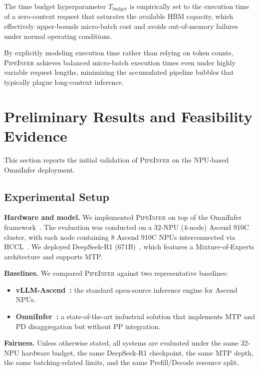 \documentclass[12pt,a4paper]{article}
\newcommand{\sys}{\textsc{PipeInfer}\xspace}
\newcommand{\Prefillterm}{Prefill\xspace}
\newcommand{\Decodeterm}{Decode\xspace}
\newcommand{\clusterconfig}{32-NPU (4-node) Ascend 910C cluster\xspace}
\begin{document}
The time budget hyperparameter $T_{\mathrm{budget}}$ is empirically set to the execution time of a zero-context request that saturates the available HBM capacity, which effectively upper-bounds micro-batch cost and avoids out-of-memory failures under normal operating conditions.

By explicitly modeling execution time rather than relying on token counts, \sys achieves balanced micro-batch execution times even under highly variable request lengths, minimizing the accumulated pipeline bubbles that typically plague long-context inference.

\section{Preliminary Results and Feasibility Evidence}

This section reports the initial validation of \sys on the NPU-based OmniInfer deployment.

\subsection{Experimental Setup}

\textbf{Hardware and model.}
We implemented \sys on top of the OmniInfer framework~\cite{omniinfer}.
The evaluation was conducted on a \clusterconfig, with each node containing 8 Ascend 910C NPUs interconnected via HCCL~\cite{hccl}.
We deployed DeepSeek-R1 (671B)~\cite{deepseek-r1}, which features a Mixture-of-Experts architecture and supports MTP.

\textbf{Baselines.}
We compared \sys against two representative baselines:
\begin{itemize}[leftmargin=*]
    \item \textbf{vLLM-Ascend~\cite{vllm,vllm-ascend}:} the standard open-source inference engine for Ascend NPUs.
    \item \textbf{OmniInfer~\cite{omniinfer}:} a state-of-the-art industrial solution that implements MTP and PD disaggregation but without PP integration.
\end{itemize}

\textbf{Fairness.}
Unless otherwise stated, all systems are evaluated under the same 32-NPU hardware budget, the same DeepSeek-R1 checkpoint, the same MTP depth, the same batching-related limits, and the same \Prefillterm/\Decodeterm resource split.
\end{document}
